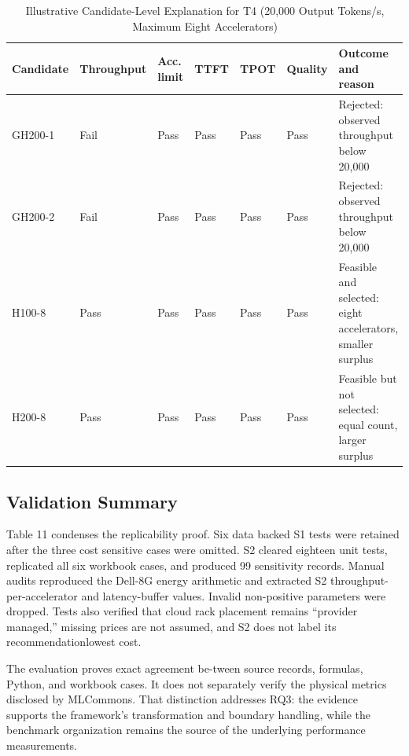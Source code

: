 \documentclass[final,3p,12pt,nopreprintline]{elsarticle}
\begin{document}
\begin{table}[htbp]
\caption{Illustrative Candidate-Level Explanation for T4 (20,000 Output Tokens/s, Maximum Eight Accelerators)}
\label{tab:t4explanation}
\centering
\footnotesize
\setlength{\tabcolsep}{3pt}
\renewcommand{\arraystretch}{1.08}
\begin{tabularx}{\textwidth}{p{1.8cm}p{2.2cm}p{1.9cm}p{1.2cm}p{1.2cm}p{1.3cm}X}
\toprule
\textbf{Candidate} & \textbf{Throughput} & \textbf{Acc. limit} & \textbf{TTFT} & \textbf{TPOT} & \textbf{Quality} & \textbf{Outcome and reason}\\
\midrule
GH200-1 & Fail & Pass & Pass & Pass & Pass & Rejected: observed throughput below 20,000\\
GH200-2 & Fail & Pass & Pass & Pass & Pass & Rejected: observed throughput below 20,000\\
H100-8 & Pass & Pass & Pass & Pass & Pass & Feasible and selected: eight accelerators, smaller surplus\\
H200-8 & Pass & Pass & Pass & Pass & Pass & Feasible but not selected: equal count, larger surplus\\
\bottomrule
\end{tabularx}
\end{table}

\subsection{Validation Summary}


Table 11 condenses the replicability proof. Six data backed S1 tests were retained after the three cost sensitive cases were omitted. S2 cleared eighteen unit tests, replicated all six workbook cases, and produced 99 sensitivity records. Manual audits reproduced the Dell-8G energy arithmetic and extracted S2 throughput-per-accelerator and latency-buffer values. Invalid non-positive parameters were dropped. Tests also verified that cloud rack placement remains “provider managed,” missing prices are not assumed, and S2 does not label its recommendationlowest cost.


The evaluation proves exact agreement be-tween source records, formulas, Python, and workbook cases. It does not separately verify the physical metrics disclosed by MLCommons. That distinction addresses RQ3: the evidence supports the framework’s transformation and boundary handling, while the benchmark organization remains the source of the underlying performance measurements.
\end{document}
